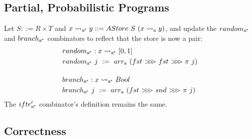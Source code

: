 \documentclass[preprint]{sigplanconf}
\newcommand{\arrow}{\rightsquigarrow}
\newcommand{\arrowarr}{\ensuremath{arr}}
\newcommand{\arrowcomp}{\ensuremath{{>}\mspace{-6mu}{>}\mspace{-6mu}{>}}}
\newcommand{\arrowif}{\ensuremath{ifte}}
\newcommand{\gen}{_\mathrm{a}}
\newcommand{\genc}{_\mathrm{a^{\mspace{-2mu}*}}}
\begin{document}
\subsection{Partial, Probabilistic Programs}

Let $S ::= R \times T$ and $x \arrow\genc y ::= AStore~S~(x \arrow\gen y)$, and update the $random\genc$ and $branch\genc$ combinators to reflect that the store is now a pair:
\begin{align}
	&\begin{aligned}
		&random\genc : x \arrow\genc [0,1] \\
		&random\genc~j \ := \ \arrowarr\gen~(fst~\arrowcomp~fst~\arrowcomp~\pi~j)
	\end{aligned} \\
\nonumber\\[-6pt]
	&\begin{aligned}
		&branch\genc : x \arrow\genc Bool \\
		&branch\genc~j \ := \ \arrowarr\gen~(fst~\arrowcomp~snd~\arrowcomp~\pi~j)
	\end{aligned}
\end{align}
The $\arrowif\genc'$ combinator's definition remains the same.

\subsection{Correctness}
\end{document}
